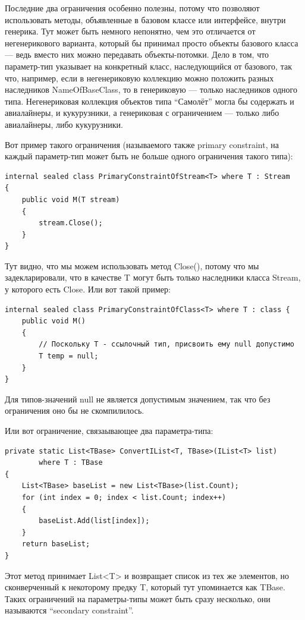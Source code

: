 \documentclass[a5paper]{article}
\begin{document}
Последние два ограничения особенно полезны, потому что позволяют использовать методы, объявленные в базовом классе или интерфейсе, внутри генерика. Тут может быть немного непонятно, чем это отличается от негенерикового варианта, который бы принимал просто объекты базового класса --- ведь вместо них можно передавать объекты-потомки. Дело в том, что параметр-тип указывает на конкретный класс, наследующийся от базового, так что, например, если в негенериковую коллекцию можно положить разных наследников NameOfBaseClass, то в генериковую --- только наследников одного типа. Негенериковая коллекция объектов типа ``Самолёт'' могла бы содержать и авиалайнеры, и кукурузники, а генериковая с ограничением --- только либо авиалайнеры, либо кукурузники.

Вот пример такого ограничения (называемого также primary constraint, на каждый параметр-тип может быть не больше одного ограничения такого типа):

\begin{verbatim}
internal sealed class PrimaryConstraintOfStream<T> where T : Stream 
{
    public void M(T stream) 
    {
        stream.Close();
    }
}
\end{verbatim}

Тут видно, что мы можем использовать метод Close(), потому что мы задекларировали, что в качестве T могут быть только наследники класса Stream, у которого есть Close. Или вот такой пример:

\begin{verbatim}
internal sealed class PrimaryConstraintOfClass<T> where T : class {
    public void M() 
    {
        // Поскольку T - ссылочный тип, присвоить ему null допустимо
        T temp = null;
    }
}
\end{verbatim}

Для типов-значений null не является допустимым значением, так что без ограничения оно бы не скомпилилось.

Или вот ограничение, связаывающее два параметра-типа:

\begin{verbatim}
private static List<TBase> ConvertIList<T, TBase>(IList<T> list)
        where T : TBase 
{
    List<TBase> baseList = new List<TBase>(list.Count);
    for (int index = 0; index < list.Count; index++) 
    {
        baseList.Add(list[index]);
    }
    return baseList;
}
\end{verbatim}

Этот метод принимает List<T> и возвращает список из тех же элементов, но сконверченный к некоторому предку T, который тут упоминается как TBase. Таких ограничений на параметры-типы может быть сразу несколько, они называются ``secondary constraint''.
\end{document}
